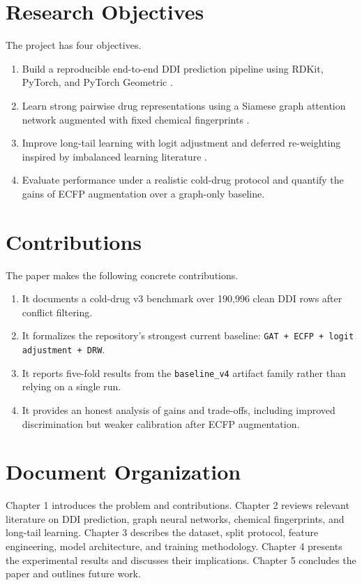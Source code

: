 \documentclass[12pt,a4paper]{report}
\begin{document}
\section{Research Objectives}
The project has four objectives.
\begin{enumerate}
  \item Build a reproducible end-to-end DDI prediction pipeline using RDKit, PyTorch, and PyTorch Geometric \cite{fey2019pyg}.
  \item Learn strong pairwise drug representations using a Siamese graph attention network \cite{velickovic2018gat} augmented with fixed chemical fingerprints \cite{rogers2010ecfp}.
  \item Improve long-tail learning with logit adjustment \cite{menon2021logit} and deferred re-weighting inspired by imbalanced learning literature \cite{cao2019ldam}.
  \item Evaluate performance under a realistic cold-drug protocol and quantify the gains of ECFP augmentation over a graph-only baseline.
\end{enumerate}

\section{Contributions}
The paper makes the following concrete contributions.
\begin{enumerate}
  \item It documents a cold-drug v3 benchmark over 190{,}996 clean DDI rows after conflict filtering.
  \item It formalizes the repository's strongest current baseline: \texttt{GAT + ECFP + logit adjustment + DRW}.
  \item It reports five-fold results from the \texttt{baseline\_v4} artifact family rather than relying on a single run.
  \item It provides an honest analysis of gains and trade-offs, including improved discrimination but weaker calibration after ECFP augmentation.
\end{enumerate}

\section{Document Organization}
Chapter 1 introduces the problem and contributions. Chapter 2 reviews relevant literature on DDI prediction, graph neural networks, chemical fingerprints, and long-tail learning. Chapter 3 describes the dataset, split protocol, feature engineering, model architecture, and training methodology. Chapter 4 presents the experimental results and discusses their implications. Chapter 5 concludes the paper and outlines future work.
\end{document}
